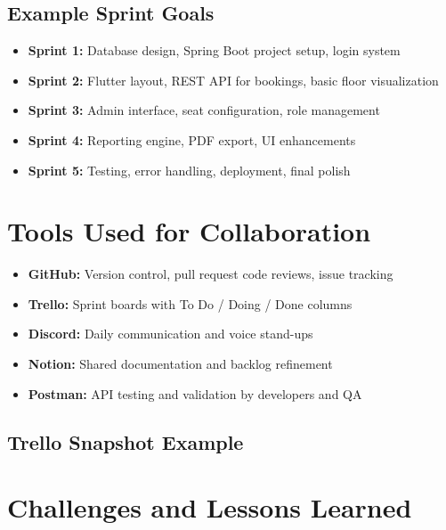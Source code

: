 \documentclass[12pt,a4paper]{report}
\begin{document}
\subsection*{Example Sprint Goals}

\begin{itemize}
    \item \textbf{Sprint 1:} Database design, Spring Boot project setup, login system
    \item \textbf{Sprint 2:} Flutter layout, REST API for bookings, basic floor visualization
    \item \textbf{Sprint 3:} Admin interface, seat configuration, role management
    \item \textbf{Sprint 4:} Reporting engine, PDF export, UI enhancements
    \item \textbf{Sprint 5:} Testing, error handling, deployment, final polish
\end{itemize}

\section{Tools Used for Collaboration}

\begin{itemize}
    \item \textbf{GitHub:} Version control, pull request code reviews, issue tracking
    \item \textbf{Trello:} Sprint boards with To Do / Doing / Done columns
    \item \textbf{Discord:} Daily communication and voice stand-ups
    \item \textbf{Notion:} Shared documentation and backlog refinement
    \item \textbf{Postman:} API testing and validation by developers and QA
\end{itemize}

\subsection*{Trello Snapshot Example}


\section{Challenges and Lessons Learned}
\end{document}
